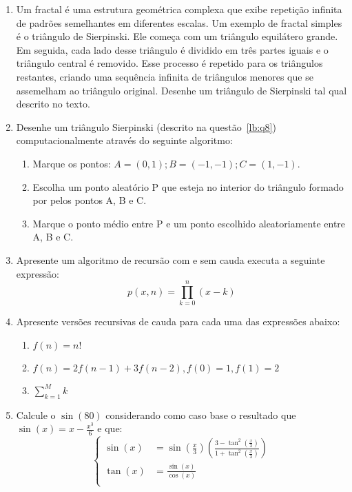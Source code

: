 \documentclass[12pt]{article}
\begin{document}
\begin{enumerate}[label=\textbf{Q\arabic*}]
    \item Um fractal é uma estrutura geométrica complexa que exibe repetição infinita de padrões semelhantes em diferentes escalas. Um exemplo de fractal simples é o triângulo de Sierpinski. Ele começa com um triângulo equilátero grande. Em seguida, cada lado desse triângulo é dividido em três partes iguais e o triângulo central é removido. Esse processo é repetido para os triângulos restantes, criando uma sequência infinita de triângulos menores que se assemelham ao triângulo original. Desenhe um triângulo de Sierpinski tal qual descrito no texto.\label{lb:q8}
    \item Desenhe um triângulo Sierpinski (descrito na questão~\ref{lb:q8}) computacionalmente através do seguinte algoritmo:
          \begin{enumerate}
              \item Marque os pontos: $A = (0,1); B = (-1,-1); C=(1, -1)$.
              \item Escolha um ponto aleatório P que esteja no interior do triângulo formado por pelos pontos A, B e C.
              \item Marque o ponto médio entre P e um ponto escolhido aleatoriamente entre A, B e C.
          \end{enumerate}
    \item Apresente um algoritmo de recursão com e sem cauda executa a seguinte expressão:
          $$p(x, n) = \prod_{k=0}^{n} (x-k)$$
    \item Apresente versões recursivas de cauda para cada uma das expressões abaixo:
          \begin{enumerate}
              \item $f(n) = n!$
              \item $f(n) = 2 f(n-1) + 3f(n-2), f(0)=1, f(1)=2$
              \item $\displaystyle \sum_{k=1}^{M} k$
          \end{enumerate}
    \item Calcule o $\sin(80)$ considerando como caso base o resultado que $\displaystyle\sin(x) = x - \frac{x^3}{6}$ e que:
          \[
              \begin{cases}
                  \sin(x) & = \sin\left(\frac{x}{3}\right)\left(\frac{3-\tan^2\left(\frac{x}{3}\right)}{1+\tan^2\left(\frac{x}{3}\right)}\right) \\
                  \tan(x) & = \frac{\sin(x)}{\cos(x)}                                                                                            \\

\end{cases}\]
\end{enumerate}
\end{document}
